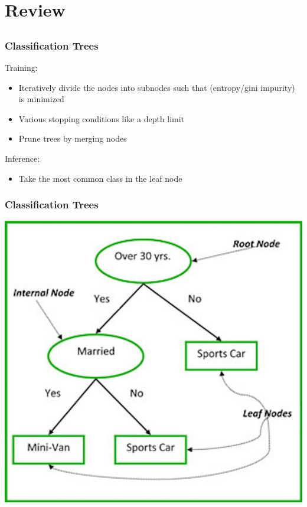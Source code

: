 \documentclass[table,dvipsnames]{beamer}
\begin{document}
\section{Review}
\subsection{}

\begin{frame}
\frametitle{Classification Trees}
Training:
\begin{itemize}
    \item Iteratively divide the nodes into subnodes such that (entropy/gini impurity) is minimized
    \item Various stopping conditions like a depth limit
    \item Prune trees by merging nodes
\end{itemize}

Inference:
\begin{itemize}
    \item Take the most common class in the leaf node
\end{itemize}
\end{frame}


\begin{frame}
\frametitle{Classification Trees}
\begin{center}
\includegraphics[scale=0.25]{imgs/decision_tree.png}
\end{center}
\end{frame}
\end{document}
